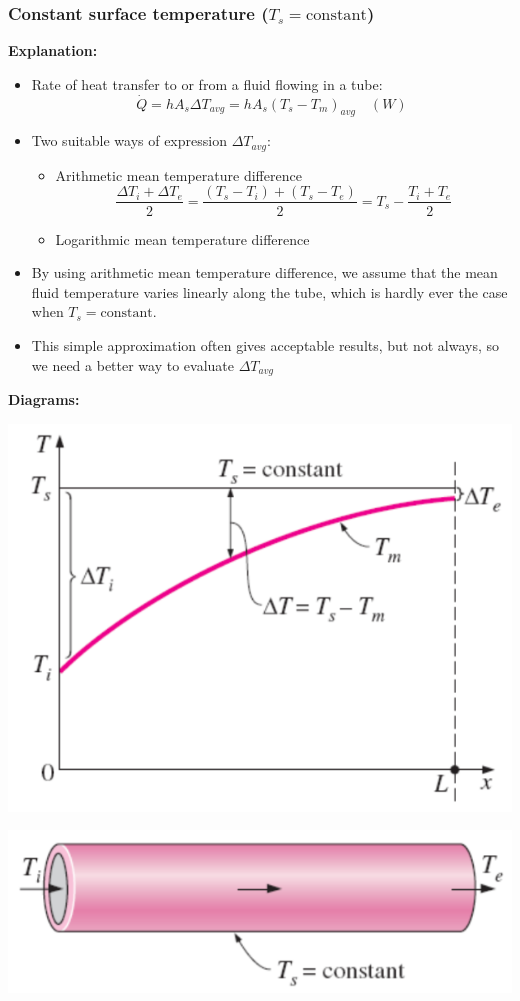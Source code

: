 \documentclass[11pt]{article}
\begin{document}
\subsubsection{Constant surface temperature (\(T_s = \text{constant}\))}
\label{sec:orge99dcf5}
\textbf{Explanation:}
\begin{itemize}
\item Rate of heat transfer to or from a fluid flowing in a tube:
\[\dot{Q} = hA_s \Delta T_{avg} = hA_s (T_s - T_m)_{avg} \quad (\unit{W})\]
\item Two suitable ways of expression \(\Delta T_{avg}\):
\begin{itemize}
\item Arithmetic mean temperature difference
\[\frac{\Delta T_i + \Delta T_e}{2} = \frac{(T_s - T_i) + (T_s - T_e)}{2} = T_s - \frac{T_i + T_e}{2}\]
\item Logarithmic mean temperature difference
\end{itemize}
\item By using arithmetic mean temperature difference, we assume that the mean fluid temperature varies linearly along the tube, which is hardly ever the case when \(T_s = \text{constant}\).
\item This simple approximation often gives acceptable results, but not always, so we need a better way to evaluate \(\Delta T_{avg}\)
\end{itemize}

 \newpage

\textbf{Diagrams:}
\begin{center}
\includegraphics[width=.9\linewidth]{./images/constant-surface-temperature-graph.png}
\end{center}
\begin{center}
\includegraphics[width=.9\linewidth]{./images/constant-surface-temperature-diagram.png}
\end{center}
\end{document}
